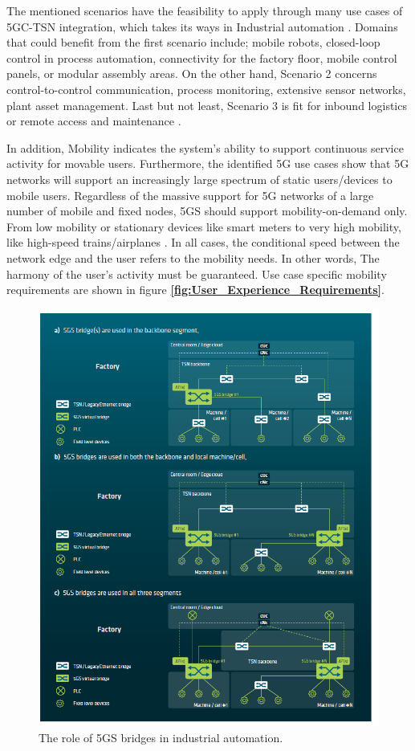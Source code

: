 The mentioned scenarios have the feasibility to apply through many use cases of 5GC-TSN integration, which takes its ways in Industrial automation \cite{3gpp2018study}.
Domains that could benefit from the first scenario include;
mobile robots, closed-loop control in process automation, connectivity for the factory floor, mobile control panels, or modular assembly areas. On the other hand, Scenario 2 concerns control-to-control communication, process monitoring, extensive sensor networks,  plant asset management. Last but not least, Scenario 3 is fit for inbound logistics or remote access and maintenance \cite{Neumann2018}.

In addition, Mobility indicates the system’s ability to support continuous service activity for movable users. Furthermore, the identified 5G use cases show that 5G networks will support an increasingly large spectrum of static users/devices to mobile users. 
Regardless of the massive support for 5G networks of a large number of mobile and fixed nodes, 5GS should support mobility-on-demand only. From low mobility or stationary devices like smart meters to very high mobility, like high-speed trains/airplanes \cite{alliance20155g}. In all cases, the conditional speed between the network edge and the user refers to the mobility needs. In other words,  The harmony of the user's activity must be guaranteed.  Use case specific mobility requirements are shown in figure
\textbf{\ref{fig:User_Experience_Requirements}}.




\begin{figure}

\centering
\includegraphics[scale=0.60]{images/The role of 5GS bridges in industrial automation.png} 
\caption{The role of 5GS bridges in industrial automation\cite{5gacia2021_study}.}
\label{fig:The_role_5GS_bridgesindustrial_automation}
\end{figure}

